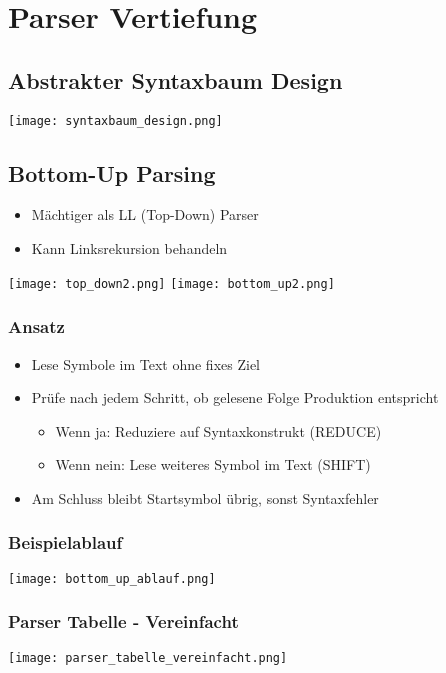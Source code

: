 \section{Parser Vertiefung}
\subsection{Abstrakter Syntaxbaum Design}
\texttt{[image: syntaxbaum\_design.png]}

\subsection{Bottom-Up Parsing}
\begin{itemize}
    \item Mächtiger als LL (Top-Down) Parser
    \item Kann Linksrekursion behandeln
\end{itemize}
\texttt{[image: top\_down2.png]}
\texttt{[image: bottom\_up2.png]}

\subsubsection{Ansatz}
\begin{itemize}
    \item Lese Symbole im Text ohne fixes Ziel
    \item Prüfe nach jedem Schritt, ob gelesene Folge Produktion entspricht
    \begin{itemize}
        \item Wenn ja: Reduziere auf Syntaxkonstrukt (REDUCE)
        \item Wenn nein: Lese weiteres Symbol im Text (SHIFT)
    \end{itemize}
    \item Am Schluss bleibt Startsymbol übrig, sonst Syntaxfehler
\end{itemize}

\subsubsection{Beispielablauf}
\texttt{[image: bottom\_up\_ablauf.png]}
\subsubsection{Parser Tabelle - Vereinfacht}
\texttt{[image: parser\_tabelle\_vereinfacht.png]}

